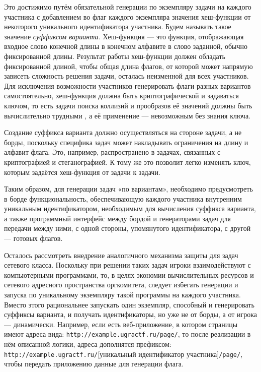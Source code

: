Это достижимо путём обязательной генерации по экземпляру задачи на каждого участника с добавлением во флаг каждого экземпляра значения хеш-функции от некоторого уникального идентификатора участника. Будем называть такое значение \textit{суффиксом варианта.} Хеш-функция --- это функция, отображающая входное слово конечной длины в конечном алфавите в слово заданной, обычно фиксированной длины\cite{Cryptodict}. Результат работы хеш-функции должен обладать фиксированной длиной, чтобы общая длина флагов, от которой может напрямую зависеть сложность решения задачи, осталась неизменной для всех участников. Для исключения возможности участников генерировать флаги разных вариантов самостоятельно, хеш-функция должна быть криптографической и задаваться ключом, то есть задачи поиска коллизий и прообразов её значений должны быть вычислительно трудными \cite{Cryptodict}, а её применение --- невозможным без знания ключа.

Создание суффикса варианта должно осуществляться на стороне задачи, а не борды, поскольку специфика задач может накладывать ограничения на длину и алфавит флага. Это, например, распространено в задачах, связанных с криптографией и стеганографией. К тому же это позволит легко изменять ключ, которым задаётся хеш-функция от задачи к задачи.

Таким образом, для генерации задач «по вариантам», необходимо предусмотреть в борде функциональность, обеспечивающую каждого участника внутренним уникальным идентификатором, необходимым для вычисления суффикса варианта, а также программный интерфейс между бордой и генераторами задач для передачи между ними, с одной стороны, упомянутого идентификатора, с другой — готовых флагов.

Осталось рассмотреть внедрение аналогичного механизма защиты для задач сетевого класса. Поскольку при решении таких задач игроки взаимодействуют с компьютерными программами, то, в целях экономии вычислительных ресурсов и сетевого адресного пространства оргкомитета, следует избегать генерации и запуска по уникальному экземпляру такой программы на каждого участника. Вместо этого рациональнее запускать один экземпляр, способный и генерировать суффиксы варианта, и получать идентификаторы, но уже не от борды, а от игрока --- динамически. Например, если есть веб-приложение, в котором страницы имеют адреса вида: \texttt{http://example.ugractf.ru/page/}, то после реализации в нём описанной логики, адреса дополнятся префиксом: \texttt{http://example.ugractf.ru/}[уникальный идентификатор участника]\texttt{/page/}, чтобы передать приложению данные для генерации флага.

